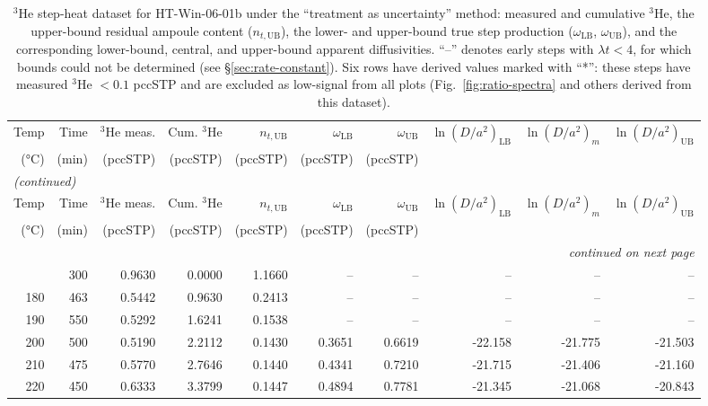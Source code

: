 \begin{landscape}
\begin{footnotesize}
\begin{longtable}{r r r r r r r r r r}
\caption{$^3$He step-heat dataset for HT-Win-06-01b under the ``treatment as uncertainty'' method: measured and cumulative $^3$He, the upper-bound residual ampoule content ($n_{t,\mathrm{UB}}$), the lower- and upper-bound true step production ($\omega_{\mathrm{LB}}$, $\omega_{\mathrm{UB}}$), and the corresponding lower-bound, central, and upper-bound apparent diffusivities. ``--'' denotes early steps with $\lambda t < 4$, for which bounds could not be determined (see \S\ref{sec:rate-constant}). Six rows have derived values marked with ``*'': these steps have measured $^3$He $<0.1$ pccSTP and are excluded as low-signal from all plots (Fig.~\ref{fig:ratio-spectra} and others derived from this dataset).}\label{tab:winsor-3he}\\
\toprule
Temp & Time & $^3$He meas. & Cum. $^3$He & $n_{t,\mathrm{UB}}$ & $\omega_{\mathrm{LB}}$ & $\omega_{\mathrm{UB}}$ & $\ln(D/a^2)_{\mathrm{LB}}$ & $\ln(D/a^2)_{m}$ & $\ln(D/a^2)_{\mathrm{UB}}$ \\
(°C) & (min) & (pccSTP) & (pccSTP) & (pccSTP) & (pccSTP) & (pccSTP) &  &  &  \\
\midrule
\endfirsthead
\multicolumn{10}{l}{\textit{(continued)}} \\
\toprule
Temp & Time & $^3$He meas. & Cum. $^3$He & $n_{t,\mathrm{UB}}$ & $\omega_{\mathrm{LB}}$ & $\omega_{\mathrm{UB}}$ & $\ln(D/a^2)_{\mathrm{LB}}$ & $\ln(D/a^2)_{m}$ & $\ln(D/a^2)_{\mathrm{UB}}$ \\
(°C) & (min) & (pccSTP) & (pccSTP) & (pccSTP) & (pccSTP) & (pccSTP) &  &  &  \\
\midrule
\endhead
\midrule
\multicolumn{10}{r}{\textit{continued on next page}} \\
\endfoot
\bottomrule
\endlastfoot
170 & 300 & 0.9630 & 0.0000 & 1.1660 & -- & -- & -- & -- & -- \\
180 & 463 & 0.5442 & 0.9630 & 0.2413 & -- & -- & -- & -- & -- \\
190 & 550 & 0.5292 & 1.6241 & 0.1538 & -- & -- & -- & -- & -- \\
200 & 500 & 0.5190 & 2.2112 & 0.1430 & 0.3651 & 0.6619 & -22.158 & -21.775 & -21.503 \\
210 & 475 & 0.5770 & 2.7646 & 0.1440 & 0.4341 & 0.7210 & -21.715 & -21.406 & -21.160 \\
220 & 450 & 0.6333 & 3.3799 & 0.1447 & 0.4894 & 0.7781 & -21.345 & -21.068 & -20.843 \\

\end{longtable}
\end{footnotesize}
\end{landscape}
